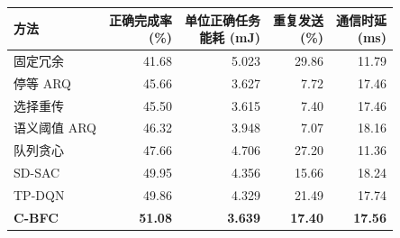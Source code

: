 \begin{table}[t]
  \centering\small
  \setlength{\tabcolsep}{3.5pt}
  \label{rq3:tab:reference-results}
  \begin{tabular*}{\linewidth}{@{\extracolsep{\fill}}lrrrr@{}}
    \toprule
    方法 & \shortstack{正确完成率\\(\%)} & \shortstack{单位正确任务\\能耗 (mJ)} & \shortstack{重复发送\\(\%)} & \shortstack{通信时延\\(ms)}\\
    \midrule
    固定冗余 & 41.68 & 5.023 & 29.86 & 11.79\\
    停等 ARQ & 45.66 & 3.627 & 7.72 & 17.46\\
    选择重传 & 45.50 & 3.615 & 7.40 & 17.46\\
    语义阈值 ARQ & 46.32 & 3.948 & 7.07 & 18.16\\
    队列贪心 & 47.66 & 4.706 & 27.20 & 11.36\\
    SD-SAC & 49.95 & 4.356 & 15.66 & 18.24\\
    TP-DQN & 49.86 & 4.329 & 21.49 & 17.74\\
    \midrule
    \textbf{C-BFC} & \textbf{51.08} & \textbf{3.639} & \textbf{17.40} & \textbf{17.56}\\
    \bottomrule
  \end{tabular*}
  \par\vspace{4pt}{\footnotesize 参考条件为 25 ms 任务时限、6 ms 反馈延迟、25\% 反馈丢失率及每节点 0.15 J 发送能量。}
\end{table}
